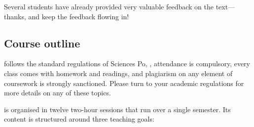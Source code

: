 	Several students have already provided very valuable feedback on the text—thanks, and keep the feedback flowing in!%

%
\subsection{Course outline}%

 follows the standard regulations of Sciences Po, \ie, attendance is compulsory, every class comes with homework and readings, and plagiarism on any element of coursework is strongly sanctioned. Please turn to your academic regulations for more details on any of these topics.%

 is organised in twelve two-hour sessions that run over a single semester. Its content is structured around three teaching goals:%

